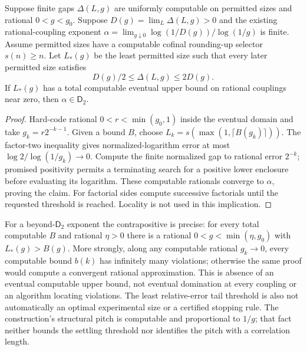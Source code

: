 \begin{theorem}\label{thm:hidden-scale}
Suppose finite gaps $\Delta(L,g)$ are uniformly computable on
permitted sizes and rational $0<g<g_0$. Suppose
$D(g)=\lim_L\Delta(L,g)>0$ and the existing rational-coupling
exponent $\alpha=\lim_{g\downarrow0}\log(1/D(g))/\log(1/g)$
is finite. Assume permitted sizes have a computable cofinal
rounding-up selector $s(n)\geq n$. Let $L_*(g)$ be the least
permitted size such that every later permitted size satisfies
\[
 D(g)/2\leq\Delta(L,g)\leq2D(g).
\]
If $L_*(g)$ has a total computable eventual upper bound on rational
couplings near zero, then $\alpha\in\mathsf D_2$.
\end{theorem}
\begin{proof}
Hard-code rational $0<r<\min(g_0,1)$ inside the eventual domain
and take $g_k=r2^{-k-1}$. Given a bound $B$, choose
$L_k=s(\max(1,\lceil B(g_k)\rceil))$. The factor-two inequality
gives normalized-logarithm error at most
$\log2/\log(1/g_k)\to0$. Compute the finite normalized gap to
rational error $2^{-k}$; promised positivity permits a terminating
search for a positive lower enclosure before evaluating its logarithm.
These computable rationals converge to $\alpha$, proving the claim.
For factorial sides compute successive factorials until the requested
threshold is reached. Locality is not used in this implication.
\end{proof}
For a beyond-$\mathsf D_2$ exponent the contrapositive is precise:
for every total computable $B$ and rational $\eta>0$ there is a
rational $0<g<\min(\eta,g_0)$ with $L_*(g)>B(g)$.
More strongly, along any computable rational $g_k\to0$, every
computable bound $b(k)$ has infinitely many violations; otherwise
the same proof would compute a convergent rational approximation.
This is absence of an eventual computable upper bound, not eventual
domination at every coupling or an algorithm locating violations.
The least relative-error tail threshold is also not automatically an
optimal experimental size or a certified stopping rule.
The construction's structural pitch is computable and proportional
to $1/g$; that fact neither bounds the settling threshold nor
identifies the pitch with a correlation length.

